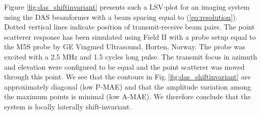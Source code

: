 \documentclass[draftcls]{IEEEtran}
\begin{document}
Figure \ref{fig:das_shiftinvariant} presents such a LSV-plot for an imaging system using the DAS beamformer with a beam spacing equal to (\ref{eq:resolution}). Dotted vertical lines indicate position of transmit-receive beam pairs. The point scatterer response has been simulated using Field II \cite{Jensen1992, Jensen1996a} with a probe setup equal to the M5S probe by GE Vingmed Ultrasound, Horten, Norway. The probe was excited with a 2.5 MHz and 1.5 cycles long pulse. The transmit focus in azimuth and elevation were configured to be equal and the point scatterer was moved through this point. We see that the contours in Fig.\,\ref{fig:das_shiftinvariant} are approximately diagonal (low P-MAE) and that the amplitude variation among the maximum points is minimal (low A-MAE). We therefore conclude that the system is locally laterally shift-invariant. %


\end{document}
